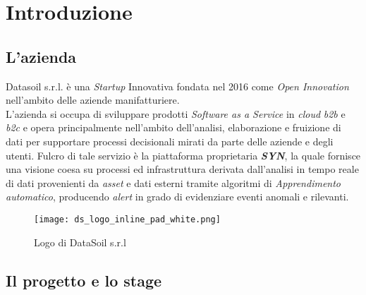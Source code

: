 
\chapter{Introduzione}
\label{cap:introduzione}


\section{L'azienda}

Datasoil s.r.l. è una \textit{Startup} Innovativa fondata nel 2016 come \textit{Open Innovation} nell'ambito delle aziende manifatturiere.\\
L'azienda si occupa di sviluppare prodotti \textit{Software as a Service} in \textit{cloud} \textit{\gls{b2b}} e \textit{\gls{b2c}} e opera principalmente nell'ambito dell'analisi, elaborazione e fruizione di dati per supportare processi decisionali mirati da parte delle aziende e degli utenti. Fulcro di tale servizio è la piattaforma proprietaria \textbf{\textit{SYN}}, la quale fornisce una visione coesa su processi ed infrastruttura derivata dall'analisi in tempo reale di dati provenienti da \textit{asset} e dati esterni tramite algoritmi di \textit{\gls{Apprendimento automatico}}, producendo \textit{alert} in grado di evidenziare eventi anomali e rilevanti.

\begin{figure}[!h] 
    \centering 
    \texttt{[image: ds\_logo\_inline\_pad\_white.png]} 
    \caption{Logo di DataSoil s.r.l}
\end{figure}

\section{Il progetto e lo stage}

